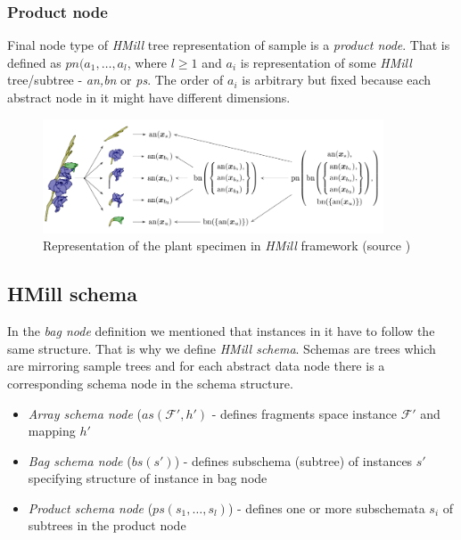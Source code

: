 \subsubsection{Product node}
Final node type of \emph{HMill} tree representation of sample is a \emph{product node}. That is defined as $pn(a_1,\dots,a_{l}$, where $l\geq1$ and $a_i$ is representation of some \emph{HMill} tree/subtree - \emph{an,bn} or \emph{ps}. The order of $a_i$ is arbitrary but fixed because each abstract node in it might have different dimensions.

\begin{figure}[h]
    \centering
    \includegraphics[width=0.9\textwidth]{figures/irismill.png}
    \caption{Representation of the plant specimen in \emph{HMill} framework (source \cite{Mandlik2020})}
    \label{fig:irismill}
\end{figure}

\subsection{HMill schema}
In the \emph{bag node} definition we mentioned that instances in it have to follow the same structure. That is why we define \emph{HMill schema}. Schemas are trees which are mirroring sample trees and for each abstract data node there is a corresponding schema node in the schema structure. 
\begin{itemize}
    \itemsep0em 
    \item \emph{Array schema node} ($as(\mathcal{F'},h')$ - defines fragments space instance $\mathcal{F'}$ and mapping $h'$
    \item \emph{Bag schema node} ($bs(s')$) - defines subschema (subtree) of instances $s'$ specifying structure of instance in bag node
    \item \emph{Product schema node} ($ps(s_1,\dots,s_{l})$) - defines one or more subschemata $s_i$ of subtrees in the product node
\end{itemize}

